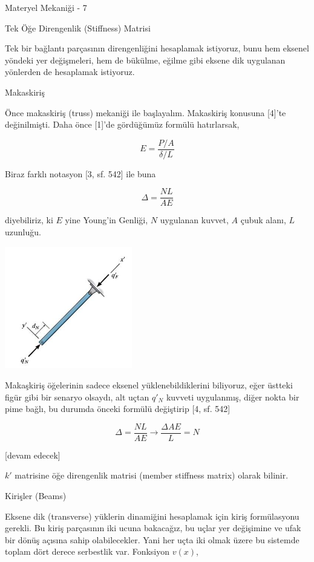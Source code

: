 \documentclass[12pt,fleqn]{article}\usepackage{../../common}
\begin{document}
Materyel Mekaniği - 7

Tek Öğe Direngenlik (Stiffness) Matrisi

Tek bir bağlantı parçasının direngenliğini hesaplamak istiyoruz, bunu hem
eksenel yöndeki yer değişmeleri, hem de bükülme, eğilme gibi eksene dik
uygulanan yönlerden de hesaplamak istiyoruz.

Makaskiriş

Önce makaskiriş (truss) mekaniği ile başlayalım. Makaskiriş konusuna [4]'te
değinilmişti. Daha önce [1]'de gördüğümüz formülü hatırlarsak,

$$
E = \frac{P/A}{\delta / L}
$$

Biraz farklı notasyon [3, sf. 542] ile buna

$$
\Delta = \frac{NL}{AE}
$$

diyebiliriz, ki $E$ yine Young'in Genliği, $N$ uygulanan kuvvet, $A$ çubuk
alanı, $L$ uzunluğu.

\includegraphics[width=15em]{phy_020_strs_05_06.jpg}

Makaşkiriş öğelerinin sadece eksenel yüklenebildiklerini biliyoruz, eğer üstteki
figür gibi bir senaryo olsaydı, alt uçtan $q'_N$ kuvveti uygulanmış, diğer nokta
bir pime bağlı, bu durumda önceki formülü değiştirip [4, sf. 542]

$$
\Delta = \frac{NL}{AE} \to \frac{\Delta AE}{L} = N
$$











[devam edecek]

$k'$ matrisine öğe direngenlik matrisi (member stiffness matrix) olarak bilinir.

Kirişler (Beams)

Eksene dik (transverse) yüklerin dinamiğini hesaplamak için kiriş formülasyonu
gerekli. Bu kiriş parçasının iki ucuna bakacağız, bu uçlar yer değişimine ve
ufak bir dönüş açısına sahip olabilecekler. Yani her uçta iki olmak üzere
bu sistemde toplam dört derece serbestlik var. Fonksiyon $v(x)$,
\end{document}
